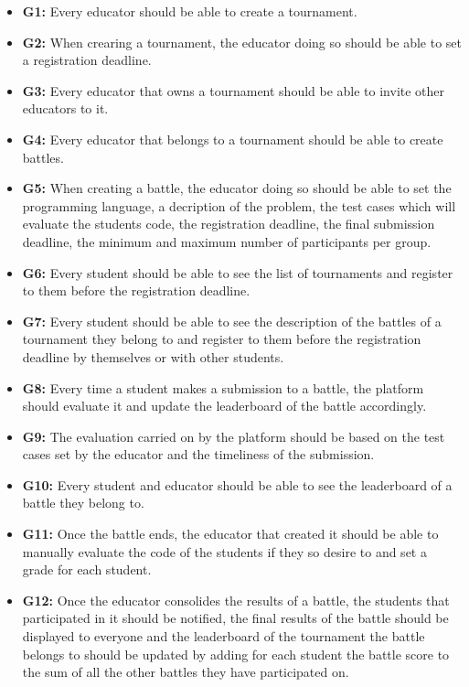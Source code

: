 \documentclass{article}
\begin{document}
\begin{itemize}
    \item \textbf{G1:} Every educator should be able to create a tournament.
    \item \textbf{G2:} When crearing a tournament, the educator doing so should be able to set a registration deadline.
    \item \textbf{G3:} Every educator that owns a tournament should be able to invite other educators to it.
    \item \textbf{G4:} Every educator that belongs to a tournament should be able to create battles.
    \item \textbf{G5:} When creating a battle, the educator doing so should be able to set the programming language, a decription of the problem, the test cases which will evaluate the students code, the registration deadline, the final submission deadline, the minimum and maximum number of participants per group.
    \item \textbf{G6:} Every student should be able to see the list of tournaments and register to them before the registration deadline.
    \item \textbf{G7:} Every student should be able to see the description of the battles of a tournament they belong to and register to them before the registration deadline by themselves or with other students.
    \item \textbf{G8:} Every time a student makes a submission to a battle, the platform should evaluate it and update the leaderboard of the battle accordingly.
    \item \textbf{G9:} The evaluation carried on by the platform should be based on the test cases set by the educator and the timeliness of the submission.
    \item \textbf{G10:} Every student and educator should be able to see the leaderboard of a battle they belong to.
    \item \textbf{G11:} Once the battle ends, the educator that created it should be able to manually evaluate the code of the students if they so desire to and set a grade for each student.
    \item \textbf{G12:} Once the educator consolides the results of a battle, the students that participated in it should be notified, the final results of the battle should be displayed to everyone and the leaderboard of the tournament the battle belongs to should be updated by adding for each student the battle score to the sum of all the other battles they have participated on.

\end{itemize}
\end{document}
